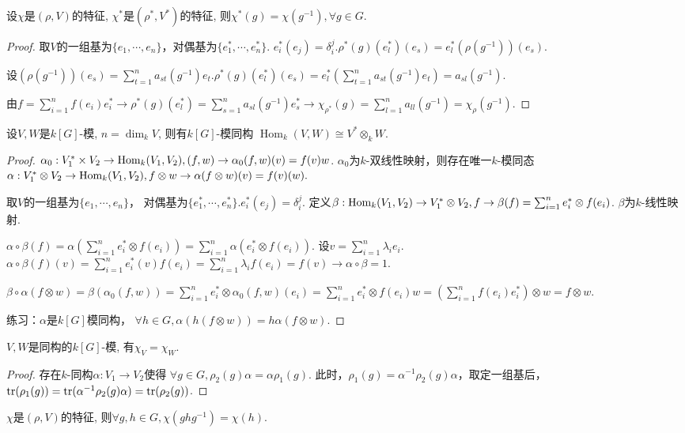 \begin{proposition}
    设$\chi$是$(\rho,V)$的特征, $\chi^*$是$(\rho^*,V^*)$的特征, 
    则$\chi^*(g)=\chi(g^{-1}), \forall g\in G$.
\end{proposition}
\begin{proof}
	取$V$的一组基为$\{e_1,\cdots,e_n\}$，对偶基为$\{e_1^{*},\cdots,e_n^{*}\}$.
    $e_i^{*}(e_j)=\delta^j_i.\rho^{*}(g)(e_l^{*})(e_s)=e_l^{*}(\rho(g^{-1}))(e_s)$.
	
	设$(\rho(g^{-1}))(e_s)=\sum_{t=1}^{n} a_{st}(g^{-1})e_t.
    \rho^{*}(g)(e_l^{*})(e_s)=e_l^{*}(\sum_{t=1}^{n} a_{st}(g^{-1})e_t)
    =a_{sl}(g^{-1}).$
	
	由$f=\sum_{i=1}^{n} f(e_i)e_i^{*}\rightarrow \rho^{*}(g)(e_l^{*})
    =\sum_{s=1}^{n} a_{sl}(g^{-1})e^{*}_s\rightarrow \chi_{\rho ^{*}}(g)
    =\sum_{l=1}^{n} a_{ll}(g^{-1})=\chi_{\rho}(g^{-1}).$
\end{proof}
\begin{proposition}
    设$V,W$是$k[G]$-模, $n=\dim_k V$, 则有$k[G]$-模同构
    $\operatorname{Hom}_k(V,W)\cong V^*\otimes_k W$.
\end{proposition}
\begin{proof}
	$\alpha_0 :V_1^{*}\times V_2\rightarrow \operatorname{Hom}_k(V_1,V_2),(f,w)
    \rightarrow \alpha_0(f,w)(v)=f(v)w$.
    $\alpha_0$为$k$-双线性映射，则存在唯一$k$-模同态
    $\alpha:V_1^{*}\otimes V_2\rightarrow \operatorname{Hom}_k(V_1,V_2),
    f\otimes w\rightarrow\alpha(f\otimes w)(v)=f(v)(w).$
	
	取$V$的一组基为$\{e_1,\cdots,e_n\}$，
    对偶基为$\{e_1^{*},\cdots,e_n^{*}\}$.$e_i^{*}(e_j)=\delta^j_i.$
    定义$\beta :\operatorname{Hom}_k(V_1,V_2)\rightarrow V_1^{*}\otimes V_2,
    f\rightarrow \beta(f)=\sum_{i=1}^{n} e_i^{*}\otimes f(e_i)$.
    $\beta$为$k$-线性映射.
	
	$\alpha\circ\beta (f)=\alpha(\sum_{i=1}^{n} e_i^{*}\otimes f(e_i))
    =\sum_{i=1}^{n} \alpha(e^{*}_i\otimes f(e_i)).$
	设$v=\sum_{i=1}^{n} \lambda_ie_i$.$\alpha\circ\beta (f)(v)
    =\sum_{i=1}^{n} e^{*}_i(v) f(e_i)=\sum_{i=1}^{n} \lambda_if(e_i)
    =f(v)\rightarrow\alpha\circ\beta=1.$
	
	$\beta\circ\alpha(f\otimes w)=\beta(\alpha_0(f,w))
    =\sum_{i=1}^{n} e_i^{*}\otimes \alpha_0(f,w)(e_i)
    =\sum_{i=1}^{n} e_i^{*}\otimes f(e_i)w
    =(\sum_{i=1}^{n} f(e_i)e_i^{*})\otimes w=f\otimes w$.
	
	练习：$\alpha$是$k[G]$模同构，
    $\forall h\in G,\alpha(h(f\otimes w))=h\alpha(f\otimes w)$.
\end{proof}
\begin{proposition}
    $V,W$是同构的$k[G]$-模, 有$\chi_V=\chi_W$.
\end{proposition}
\begin{proof}
	存在$k$-同构$\alpha:V_1\rightarrow V_2$使得
    $\forall g\in G,\rho_2(g)\alpha=\alpha \rho_1(g)$.
    此时，$\rho _1(g)=\alpha^{-1}\rho_2(g)\alpha$，取定一组基后，
    $\operatorname{tr}(\rho_1(g))=\operatorname{tr}(\alpha^{-1}\rho_2(g)\alpha)=\operatorname{tr}(\rho_2(g))$.
\end{proof}
\begin{proposition}
    $\chi$是$(\rho,V)$的特征, 则$\forall g,h\in G, \chi(ghg^{-1})=\chi(h).$
\end{proposition}

